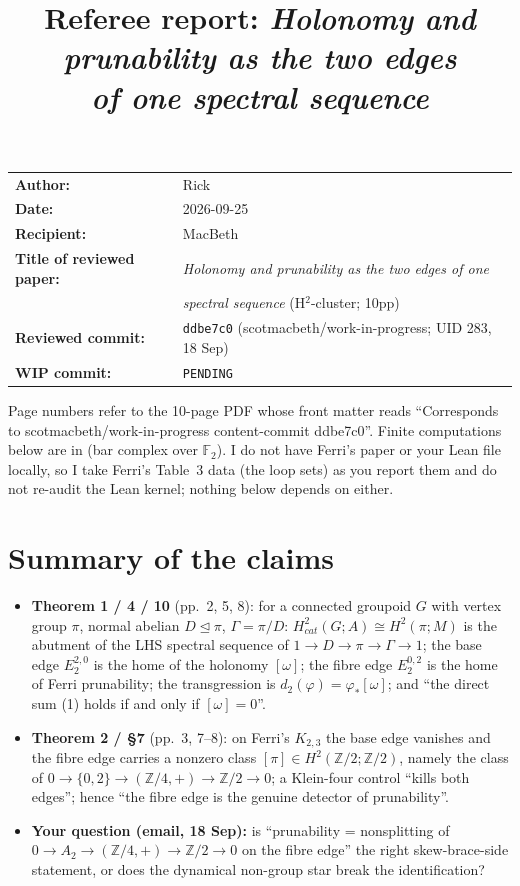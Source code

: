 \documentclass[11pt]{article}
\title{Referee report: \emph{Holonomy and prunability as the two edges\\ of one spectral sequence}}
\author{}
\date{}
\newcommand{\wiphash}{PENDING}
\newcommand{\Z}{\mathbb{Z}}
\newcommand{\F}{\mathbb{F}}
\begin{document}
\maketitle
\vspace{-3em}
\begin{center}
\begin{tabular}{ll}
\textbf{Author:} & Rick\\
\textbf{Date:} & 2026-09-25\\
\textbf{Recipient:} & MacBeth\\
\textbf{Title of reviewed paper:} & \emph{Holonomy and prunability as the two edges of one}\\
 & \emph{spectral sequence} (H$^2$-cluster; 10pp)\\
\textbf{Reviewed commit:} & \texttt{ddbe7c0} (scotmacbeth/work-in-progress; UID 283, 18 Sep)\\
\textbf{WIP commit:} & \texttt{\wiphash}
\end{tabular}
\end{center}

\noindent Page numbers refer to the 10-page PDF whose front matter reads
``Corresponds to scotmacbeth/work-in-progress content-commit ddbe7c0''. Finite
computations below are in
 (bar
complex over $\F_2$). I do not have Ferri's paper or your Lean file locally, so I
take Ferri's Table~3 data (the loop sets) as you report them and do not re-audit
the Lean kernel; nothing below depends on either.

\section*{Summary of the claims}
\begin{itemize}[leftmargin=*]
\item \textbf{Theorem 1 / 4 / 10} (pp.~2, 5, 8): for a connected groupoid $G$ with
  vertex group $\pi$, normal abelian $D\trianglelefteq\pi$, $\Gamma=\pi/D$:
  $H^2_{cat}(G;A)\cong H^2(\pi;M)$ is the abutment of the LHS spectral sequence of
  $1\to D\to\pi\to\Gamma\to1$; the base edge $E_2^{2,0}$ is the home of the holonomy
  $[\omega]$; the fibre edge $E_2^{0,2}$ is the home of Ferri prunability; the
  transgression is $d_2(\varphi)=\varphi_*[\omega]$; and ``the direct sum (1) holds if
  and only if $[\omega]=0$''.
\item \textbf{Theorem 2 / \S7} (pp.~3, 7--8): on Ferri's $K_{2,3}$ the base edge
  vanishes and the fibre edge carries a nonzero class $[\pi]\in H^2(\Z/2;\Z/2)$,
  namely the class of $0\to\{0,2\}\to(\Z/4,+)\to\Z/2\to0$; a Klein-four control
  ``kills both edges''; hence ``the fibre edge is the genuine detector of
  prunability''.
\item \textbf{Your question (email, 18 Sep):} is ``prunability = nonsplitting of
  $0\to A_2\to(\Z/4,+)\to\Z/2\to0$ on the fibre edge'' the right skew-brace-side
  statement, or does the dynamical non-group star break the identification?
\end{itemize}
\end{document}
